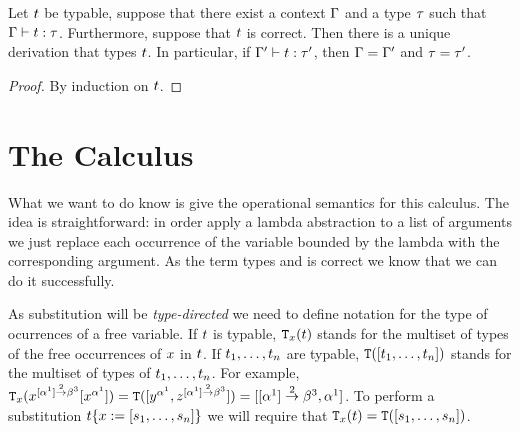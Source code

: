 \begin{lemma}
Let $t$ be typable, \ie suppose that there exist a context $\Gamma$ and a type $\tau$ such that $\Gamma \vdash t : \tau$. Furthermore, suppose that $t$ is correct.
Then there is a unique derivation that types $t$.
In particular, if $\Gamma' \vdash t : \tau'$, then $\Gamma = \Gamma'$ and $\tau = \tau'$.
\end{lemma}
\begin{proof}
By induction on $t$.
\end{proof}

\section{The Calculus}

What we want to do know is give the operational semantics for this calculus.
The idea is straightforward: in order apply a lambda abstraction to a list of arguments we just
replace each occurrence of the variable bounded by the lambda with the corresponding argument.
As the term types and is correct we know that we can do it successfully.

As substitution will be \emph{type-directed} we need to define notation for the type
of ocurrences of a free variable. If $t$ is typable,
$\mathtt{T}_{x}(t)$
stands for the multiset
of types of the free occurrences of $x$ in $t$.
If $t_1,\hdots,t_n$ are typable,
$\mathtt{T}([t_1,\hdots,t_n])$ stands for the multiset
of types of $t_1,\hdots,t_n$.
For example,
$\mathtt{T}_{x}(x^{[\alpha^1] \overset{2}{\to} \beta^3}[x^{\alpha^1}]) =
\mathtt{T}([y^{\alpha^1},z^{[\alpha^1] \overset{2}{\to} \beta^3}]) = [[\alpha^1] \overset{2}{\to} \beta^3,\alpha^1]$.
To perform a substitution $t\{x := [s_1,\hdots,s_n]\}$
we will require that $\mathtt{T}_{x}(t) = \mathtt{T}([s_1,\hdots,s_n])$.


